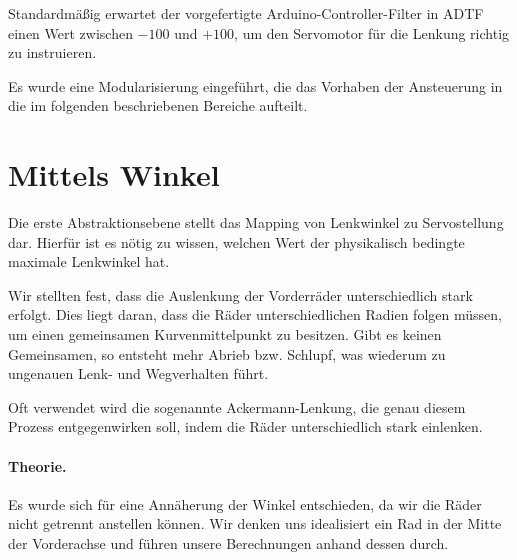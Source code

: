 \documentclass[a4paper,12pt]{report}
\begin{document}

	Standardmäßig erwartet der vorgefertigte Arduino-Controller-Filter in ADTF einen Wert zwischen $-100$ und $+100$, um den Servomotor für die Lenkung richtig zu instruieren.

	Es wurde eine Modularisierung eingeführt, die das Vorhaben der Ansteuerung in die im folgenden beschriebenen Bereiche aufteilt.

\section{Mittels Winkel}
\label{Steering-Angle-To-Servo}

	Die erste Abstraktionsebene stellt das Mapping von Lenkwinkel zu Servostellung dar.
	Hierfür ist es nötig zu wissen, welchen Wert der physikalisch bedingte maximale Lenkwinkel hat.

	Wir stellten fest, dass die Auslenkung der Vorderräder unterschiedlich stark erfolgt.
	Dies liegt daran, dass die Räder unterschiedlichen Radien folgen müssen, um einen gemeinsamen Kurvenmittelpunkt zu besitzen.
	Gibt es keinen Gemeinsamen, so entsteht mehr Abrieb bzw. Schlupf, was wiederum zu ungenauen Lenk- und Wegverhalten führt.

	Oft verwendet wird die sogenannte Ackermann-Lenkung, die genau diesem Prozess entgegenwirken soll, indem die Räder unterschiedlich stark einlenken.

	\paragraph{Theorie.}
	Es wurde sich für eine Annäherung der Winkel entschieden, da wir die Räder nicht getrennt anstellen können.
	Wir denken uns idealisiert ein Rad in der Mitte der Vorderachse und führen unsere Berechnungen anhand dessen durch.
\end{document}
